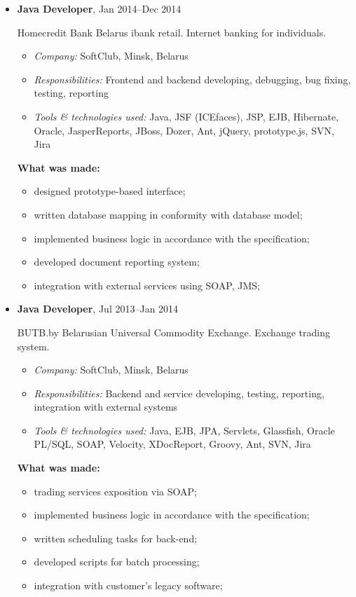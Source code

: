 \documentclass[a4paper, 12pt]{article}
\newcommand{\position}[1]{
    \textbf{#1}}
\newcommand{\itemlabel}[1]{
    \textit{#1:}}
\begin{document}
\begin{itemize}
        \item \position{Java Developer}, Jan 2014--Dec 2014

           Homecredit Bank Belarus ibank retail. Internet banking for individuals. 

            \begin{itemize}
                \item \itemlabel{Company} SoftClub, Minsk, Belarus
                \item \itemlabel{Responsibilities} Frontend and backend developing, debugging, bug fixing, testing, reporting
                \item \itemlabel{Tools \& technologies used} Java, JSF (ICEfaces), JSP, EJB, Hibernate, Oracle, JasperReports, JBoss, Dozer, Ant, jQuery, prototype.js, SVN, Jira
            \end{itemize}
            
               \textbf{What was made:}
			\begin{itemize}
  				\item designed prototype-based interface;
  				\item written database mapping in conformity with database model;
  				\item implemented business logic in accordance with the specification;
				\item developed document reporting system;
  				\item integration with external services using SOAP, JMS;
			\end{itemize}


        \item \position{Java Developer}, Jul 2013--Jan 2014

            BUTB.by Belarusian Universal Commodity Exchange. Exchange trading system.

            \begin{itemize}
                \item \itemlabel{Company} SoftClub, Minsk, Belarus
                \item \itemlabel{Responsibilities} Backend and service developing, testing, reporting, integration with external systems
                \item \itemlabel{Tools \& technologies used} Java, EJB, JPA, Servlets, Glassfish, Oracle PL/SQL, SOAP, Velocity, XDocReport, Groovy, Ant, SVN, Jira
            \end{itemize}
            
               \textbf{What was made:}
			\begin{itemize}
				\item trading services exposition via SOAP;
  				\item implemented business logic in accordance with the specification;
  				\item written scheduling tasks for back-end; 
				\item developed scripts for batch processing;
				\item integration with customer's legacy software;
			\end{itemize}


    \end{itemize}    
    
\end{document}
